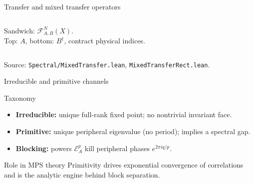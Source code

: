 \documentclass[aspectratio=169,10pt]{beamer}
\newcommand{\cE}{\mathcal{E}}
\newcommand{\cF}{\mathcal{F}}
\begin{document}
\begin{frame}{Transfer and mixed transfer operators}
\begin{columns}[T]
\begin{center}

            {\scriptsize\textcolor{dimwhite}{Sandwich: $\cF^N_{A,B}(X)$.\\Top: $A$, bottom: $B^\dagger$, contract physical indices.}}
        \end{center}
    \end{columns}

    \textcolor{dimwhite}{\footnotesize Source: \texttt{Spectral/MixedTransfer.lean}, \texttt{MixedTransferRect.lean}.}
\end{frame}

\begin{frame}{Irreducible and primitive channels~\cite{Evans1978Spectral,Wolf2012Quantum}}
    \vspace{-0.6em}

    \begin{block}{Taxonomy}
        \begin{itemize}\itemsep0.25em
            \item \textbf{Irreducible:} unique full-rank fixed point; no nontrivial invariant face.
            \item \textbf{Primitive:} unique peripheral eigenvalue (no period); implies a spectral gap.
            \item \textbf{Blocking:} powers $\cE_A^p$ kill peripheral phases $e^{2\pi i q/p}$.
        \end{itemize}
    \end{block}

    \begin{block}{Role in MPS theory}
        Primitivity drives exponential convergence of correlations~\cite{Lancien2021Correlation}
        and is the analytic engine behind block separation.
    \end{block}
\end{frame}
\end{document}
